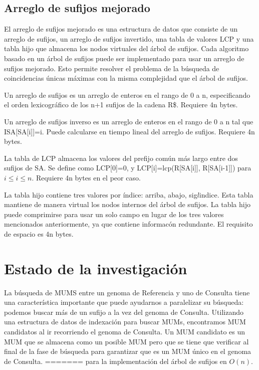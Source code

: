 \documentclass[12pt,a4paper]{article}
\begin{document}
\subsection{Arreglo de sufijos mejorado}
El arreglo de sufijos mejorado es una estructura de datos que consiste de un arreglo de sufijos, un arreglo de sufijos invertido, una tabla de valores LCP y una tabla hijo que almacena los nodos virtuales del \'arbol de sufijos. Cada algoritmo basado en un \'arbol de sufijos puede ser implementado para usar un arreglo de sufijos mejorado. Esto permite resolver el problema de la b\'usqueda de coincidencias \'unicas m\'aximas con la misma complejidad que el \'arbol de sufijos.

Un arreglo de sufijos es un arreglo de enteros en el rango de 0 a n, especificando el orden lexicogr\'afico de los n+1 sufijos de la cadena R\$. Requiere 4n bytes.

Un arreglo de sufijos inverso es un arreglo de enteros en el rango de 0 a n tal que ISA[SA[i]]=i. Puede calcularse en tiempo lineal del arreglo de sufijos. Requiere 4n bytes.

La tabla de LCP almacena los valores del prefijo com\'un m\'as largo entre dos sufijos de SA. Se define como LCP[0]=0, y LCP[i]=lcp(R[SA[i]], R[SA[i-1]]) para $i\le i\le n$. Requiere 4n bytes en el peor caso.

La tabla hijo contiene tres valores por \'indice: arriba, abajo, sig$l$indice. Esta tabla mantiene de manera virtual los nodos internos del \'arbol de sufijos. La tabla hijo puede comprimirse para usar un solo campo en lugar de los tres valores mencionados anteriormente, ya que contiene informac\'on redundante. El requisito de espacio es 4n bytes.
\section{Estado de la investigación}
La búsqueda de MUMS entre un genoma de Referencia y uno de Consulta tiene una característica importante que puede ayudarnos a paralelizar su búsqueda: podemos buscar más de un sufijo a la vez del genoma de Consulta. Utilizando una estructura de datos de indexación para buscar MUMs, encontramos MUM candidatos al ir recorriendo el genoma de Consulta. Un MUM candidato es un MUM que se almacena como un posible MUM pero que se tiene que verificar al final de la fase de búsqueda para garantizar que es un MUM único en el genoma de Consulta.
=======
para la implementación del árbol de sufijos en $O(n)$.\\
\end{document}
